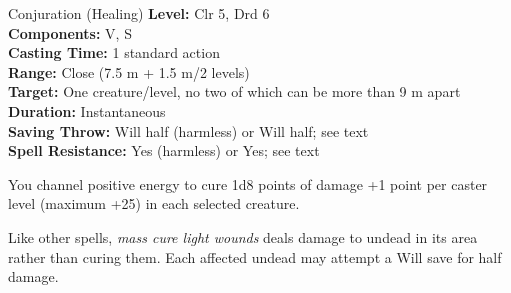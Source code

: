 {Conjuration (Healing)}
{
	\textbf{Level:}
	Clr 5, Drd 6\\
	\textbf{Components:}
	V, S\\
	\textbf{Casting Time:}
	1 standard action\\
	\textbf{Range:}
	Close (7.5 m + 1.5 m/2 levels)\\
	\textbf{Target:}
	One creature/level, no two of which can be more than 9 m apart\\
	\textbf{Duration:}
	Instantaneous\\
	\textbf{Saving Throw:}
	Will half (harmless) or Will half; see text\\
	\textbf{Spell Resistance:}
	Yes (harmless) or Yes; see text\\
}
{
	You channel positive energy to cure 1d8 points of damage +1 point per caster level (maximum +25) in each selected creature.

	Like other  spells, \emph{mass cure light wounds} deals damage to undead in its area rather than curing them. Each affected undead may attempt a Will save for half damage.

}

